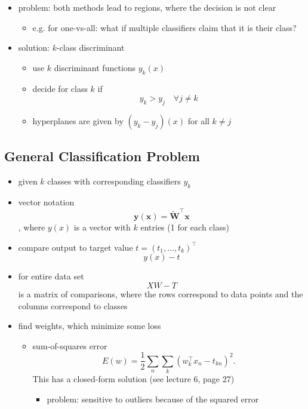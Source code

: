 \documentclass{article}
\begin{document}
\begin{itemize}
\begin{itemize}
    \item problem: both methods lead to regions, where the decision is not clear
    \begin{itemize}
      \item e.g. for one-vs-all: what if multiple classifiers claim that it is their class?
    \end{itemize}
    \item solution: $k$-class discriminant
    \begin{itemize}
      \item use $k$ discriminant functions $y_k(x)$
      \item decide for class $k$ if
      \[
        y_k > y_j \quad \forall j\not = k
      \]
      \item hyperplanes are given by $(y_k-y_j)(x)$ for all $k \not = j$
    \end{itemize}
  \end{itemize}
\end{itemize}

\subsection{General Classification Problem}

\begin{itemize}
  \item given $k$ classes with corresponding classifiers $y_k$
  \item vector notation
  \[
    \mathbf{y(x) = \tilde{W}^\top x}
  \]
  , where $y(x)$ is a vector with $k$ entries (1 for each class)
  \item compare output to target value $t = (t_1, ..., t_k)^\top$
  \[
    y(x) - t
  \]
  \item for entire data set
  \[
    XW - T
  \]
  is a matrix of comparisons, where the rows correspond to data points and the columns correspond to classes
  \item find weights, which minimize some loss
  \begin{itemize}
    \item sum-of-squares error
    \[
      E(w) = \frac{1}{2} \sum_n \sum_k (w_k^\top x_n - t_{kn})^2.
    \]
    This has a closed-form solution (see lecture 6, page 27)
    \begin{itemize}
      \item problem: sensitive to outliers because of the squared error
    \end{itemize}
  \end{itemize}
\end{itemize}
\end{document}
